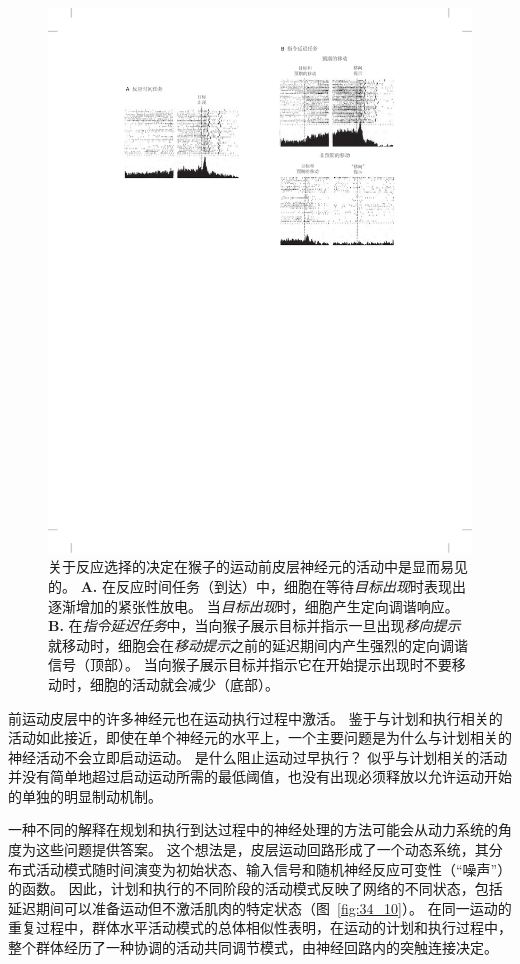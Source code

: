 \begin{figure}[htbp]
	\centering
	\includegraphics[width=0.97\linewidth]{chap34/fig_34_9}
	\caption{关于反应选择的决定在猴子的运动前皮层神经元的活动中是显而易见的\cite{crammond2000prior}。
		\textbf{A.} 在反应时间任务（到达）中，细胞在等待\textit{目标出现}时表现出逐渐增加的紧张性放电。
		当\textit{目标出现}时，细胞产生定向调谐响应。
		\textbf{B.} 在\textit{指令延迟任务}中，当向猴子展示目标并指示一旦出现\textit{移向提示}就移动时，细胞会在\textit{移动提示}之前的延迟期间内产生强烈的定向调谐信号（顶部）。
		当向猴子展示目标并指示它在开始提示出现时不要移动时，细胞的活动就会减少（底部）。}
	\label{fig:34_9}
\end{figure}


前运动皮层中的许多神经元也在运动执行过程中激活。
鉴于与计划和执行相关的活动如此接近，即使在单个神经元的水平上，一个主要问题是为什么与计划相关的神经活动不会立即启动运动。
是什么阻止运动过早执行？
似乎与计划相关的活动并没有简单地超过启动运动所需的最低阈值，也没有出现必须释放以允许运动开始的单独的明显制动机制。


一种不同的解释在规划和执行到达过程中的神经处理的方法可能会从动力系统的角度为这些问题提供答案。
这个想法是，皮层运动回路形成了一个动态系统，其分布式活动模式随时间演变为初始状态、输入信号和随机神经反应可变性（“噪声”）的函数。
因此，计划和执行的不同阶段的活动模式反映了网络的不同状态，包括延迟期间可以准备运动但不激活肌肉的特定状态（图~\ref{fig:34_10}）。
在同一运动的重复过程中，群体水平活动模式的总体相似性表明，在运动的计划和执行过程中，整个群体经历了一种协调的活动共同调节模式，由神经回路内的突触连接决定。


